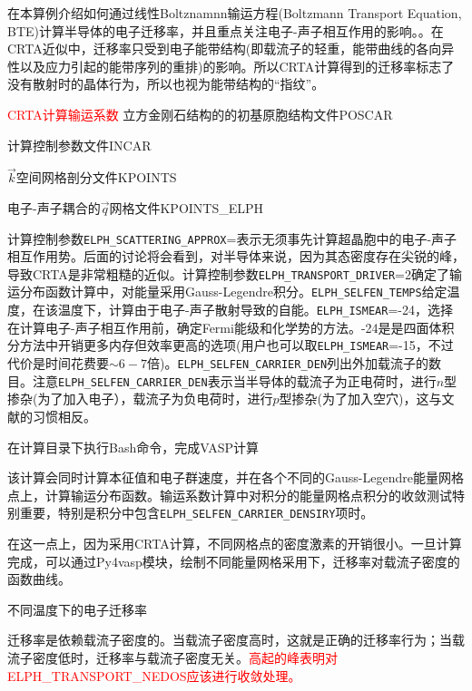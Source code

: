 
在本算例介绍如何通过线性\textrm{Boltznamnn}输运方程\textrm{(Boltzmann Transport Equation, BTE)}计算半导体的电子迁移率，并且重点关注电子-声子相互作用的影响。。在\textrm{CRTA}近似中，迁移率只受到电子能带结构(即载流子的轻重，能带曲线的各向异性以及应力引起的能带序列的重排)的影响。所以\textrm{CRTA}计算得到的迁移率标志了没有散射时的晶体行为，所以也视为能带结构的``指纹''。

\textcolor{red}{\textrm{CRTA}计算输运系数}
立方金刚石结构的的初基原胞结构文件\textrm{POSCAR}

计算控制参数文件\textrm{INCAR}

$\vec k$空间网格剖分文件\textrm{KPOINTS}

电子-声子耦合的$\vec q$网格文件\textrm{KPOINTS\_ELPH}

计算控制参数\texttt{ELPH\_SCATTERING\_APPROX}=表示无须事先计算超晶胞中的电子-声子相互作用势。后面的讨论将会看到，对半导体来说，因为其态密度存在尖锐的峰，导致\textrm{CRTA}是非常粗糙的近似。计算控制参数\texttt{ELPH\_TRANSPORT\_DRIVER}=2确定了输运分布函数计算中，对能量采用\textrm{Gauss-Legendre}积分。\texttt{ELPH\_SELFEN\_TEMPS}给定温度，在该温度下，计算由于电子-声子散射导致的自能。\texttt{ELPH\_ISMEAR}=-24，选择在计算电子-声子相互作用前，确定\textrm{Fermi}能级和化学势的方法。-24是是四面体积分方法中开销更多内存但效率更高的选项(用户也可以取\texttt{ELPH\_ISMEAR}=-15，不过代价是时间花费要$\sim6-7$倍)。\texttt{ELPH\_SELFEN\_CARRIER\_DEN}列出外加载流子的数目。注意\texttt{ELPH\_SELFEN\_CARRIER\_DEN}表示当半导体的载流子为正电荷时，进行$n$型掺杂(为了加入电子），载流子为负电荷时，进行$p$型掺杂(为了加入空穴)，这与文献的习惯相反。

在计算目录下执行\textrm{Bash}命令，完成\textrm{VASP}计算

该计算会同时计算本征值和电子群速度，并在各个不同的\textrm{Gauss-Legendre}能量网格点上，计算输运分布函数。输运系数计算中对积分的能量网格点积分的收敛测试特别重要，特别是积分中包含\texttt{ELPH\_SELFEN\_CARRIER\_DENSIRY}项时。

在这一点上，因为采用\textrm{CRTA}计算，不同网格点的密度激素的开销很小。一旦计算完成，可以通过\textrm{Py4vasp}模块，绘制不同能量网格采用下，迁移率对载流子密度的函数曲线。

不同温度下的电子迁移率

迁移率是依赖载流子密度的。当载流子密度高时，这就是正确的迁移率行为；当载流子密度低时，迁移率与载流子密度无关。\textcolor{red}{高起的峰表明对\textrm{ELPH\_TRANSPORT\_NEDOS}应该进行收敛处理。}

